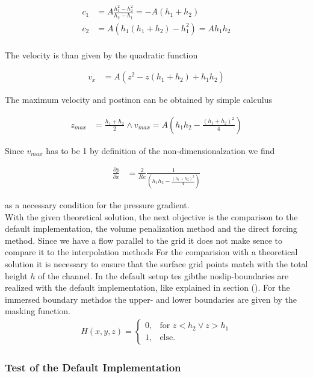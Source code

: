 \begin{align}
c_1 &= A\frac{h_1^2 -h_2^2}{h_2 - h_1} = -A(h_1+h_2)\\
c_2 &= A(h_1(h_1 + h_2) - h_1^2) = Ah_1h_2\\
\end{align}

The velocity is than given by the quadratic function

\begin{align}
v_x &= A(z^2 - z(h_1 + h_2) + h_1h_2)
\end{align}

The maximum velocity and postinon can be obtained by simple calculus

\begin{align}
z_{max} &= \frac{h_1+h_2}{2} \wedge v_{max} = A\left(h_1h_2 - \frac{(h_1 + h_2)^2}{4}\right)
\end{align}

Since $v_{max}$ has to be 1 by definition of the non-dimensionalzation we find

\begin{align}
\frac{\partial p}{\partial x} &= \frac{2}{Re}\frac{1}{\left(h_1h_2 - \frac{(h_1+h_2)^2}{4} \right)}
\end{align}

as a necessary condition for the pressure gradient.\\
With the given theoretical solution, the next objective is the comparison
to the default implementation, the volume penalization method and the direct forcing method.
Since we have a flow parallel to the grid  it does not make sence to compare it to the interpolation methods
For the comparision with a theoretical solution it is necessary to ensure that the surface grid points match with the total height $h$ of the channel.
In the default setup tes gibthe noslip-boundaries are realized with the default implementation, like explained in section ().
For the immersed boundary methdos the upper- and lower boundaries are given by the masking function.
\begin{align}
H(x, y, z) = \begin{cases}
                    0, & \text{for \  }  z < h_2 \lor z>h_1 \\
                    1, & \text{else}.
             \end{cases}
\end{align}

\subsubsection{Test of the Default Implementation}

